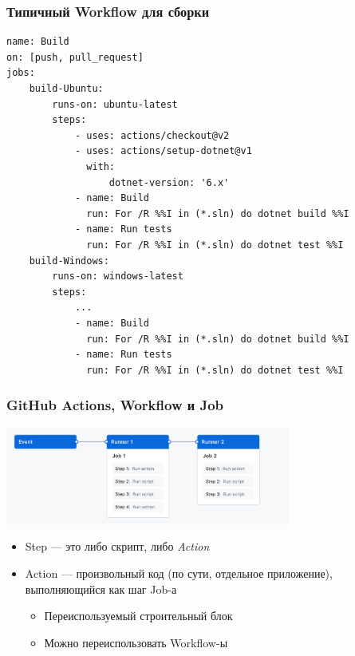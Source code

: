 \documentclass{../../slides-style}
\begin{document}
    \begin{frame}[fragile]
        \frametitle{Типичный Workflow для сборки}
        \begin{scriptsize}
            \begin{verbatim}
name: Build
on: [push, pull_request]
jobs:
    build-Ubuntu:
        runs-on: ubuntu-latest
        steps:
            - uses: actions/checkout@v2
            - uses: actions/setup-dotnet@v1
              with:
                  dotnet-version: '6.x'
            - name: Build
              run: For /R %%I in (*.sln) do dotnet build %%I
            - name: Run tests
              run: For /R %%I in (*.sln) do dotnet test %%I
    build-Windows:
        runs-on: windows-latest
        steps:
            ...
            - name: Build
              run: For /R %%I in (*.sln) do dotnet build %%I
            - name: Run tests
              run: For /R %%I in (*.sln) do dotnet test %%I
            \end{verbatim}
        \end{scriptsize}
    \end{frame}

    \begin{frame}
        \frametitle{GitHub Actions, Workflow и Job}
        \begin{center}
            \includegraphics[width=0.7\textwidth]{githubActionsWorkflow}
        \end{center}
        \begin{itemize}
            \item Step --- это либо скрипт, либо \emph{Action}
            \item Action --- произвольный код (по сути, отдельное приложение), выполняющийся как шаг Job-а
            \begin{itemize}
                \item Переиспользуемый строительный блок
                \item Можно переиспользовать Workflow-ы
            \end{itemize}
        \end{itemize}
    \end{frame}
\end{document}
